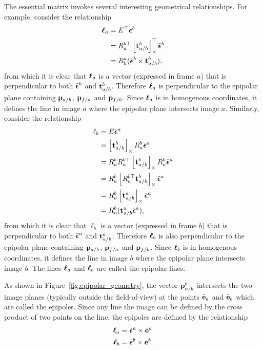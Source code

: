 The essential matrix invokes several interesting geometrical relationships.  For example, consider the relationship
\begin{align*}
\boldsymbol{\ell}_a &= E^\top \bar{\boldsymbol{\epsilon}}^b\\
	&= R_a^{b\top} \left\lfloor\mathbf{t}_{a/b}^b\right\rfloor_{\times}^\top \bar{\boldsymbol{\epsilon}}^b \\
	&= R_b^a (\bar{\boldsymbol{\epsilon}}^b \times \mathbf{t}_{a/b}^b),
\end{align*}
from which it is clear that $\boldsymbol{\ell}_a$ is a vector (expressed in frame $a$) that is perpendicular to both $\bar{\boldsymbol{\epsilon}}^b$ and $\mathbf{t}_{a/b}^b$.  Therefore $\boldsymbol{\ell}_a$ is perpendicular to the epipolar plane containing $\mathbf{p}_{a/b}$, $\mathbf{p}_{f/a}$ and $\mathbf{p}_{f/b}$.  Since $\boldsymbol{\ell}_a$ is in homogenous coordinates, it defines the line in image $a$ where the epipolar plane intersects image $a$.  
%
Similarly, consider the relationship
\begin{align*}
\ell_b &= E \bar{\boldsymbol{\epsilon}}^a \\
       &= \left\lfloor\mathbf{t}_{a/b}^b\right\rfloor_{\times}R_a^b \bar{\boldsymbol{\epsilon}}^a \\
       &= R_a^b R_a^{b\top} \left\lfloor\mathbf{t}_{a/b}^b\right\rfloor_{\times}R_a^b \bar{\boldsymbol{\epsilon}}^a \\
       &= R_a^b \left\lfloor R_a^{b\top}\mathbf{t}_{a/b}^b\right\rfloor_{\times} \bar{\boldsymbol{\epsilon}}^a\\
       &= R_a^b \left\lfloor\mathbf{t}_{a/b}^a\right\rfloor_{\times} \bar{\boldsymbol{\epsilon}}^a \\
       &= R_a^b (\mathbf{t}_{a/b}^a \bar{\boldsymbol{\epsilon}}^a),
\end{align*}
from which it is clear that $\ell_b$ is a vector (expressed in frame $b$) that is perpendicular to both $\bar{\boldsymbol{\epsilon}}^a$ and $\mathbf{t}_{a/b}^a$.  Therefore $\boldsymbol{\ell}_b$ is also perpendicular to the epipolar plane containing $\mathbf{p}_{a/b}$, $\mathbf{p}_{f/a}$ and $\mathbf{p}_{f/b}$.  Since $\boldsymbol{\ell}_b$ is in homogenous coordinates, it defines the line in image $b$ where the epipolar plane intersects image $b$.  
%
The lines $\boldsymbol{\ell}_a$ and $\boldsymbol{\ell}_b$ are called the epipolar lines.  

As shown in Figure~\ref{fig:epipolar_geometry}, the vector $\mathbf{p}_{a/b}^b$ intersects the two image planes (typically outside the field-of-view) at the points $\bar{\mathbf{e}}_a$ and $\bar{\mathbf{e}}_b$ which are called the epipoles.  Since any line the image can be defined by the cross product of two points on the line, the epipoles are defined by the relationship
\begin{align*}
\boldsymbol{\ell}_a &= \bar{\boldsymbol{\epsilon}}^a \times \bar{\mathbf{e}}^a \\
\boldsymbol{\ell}_b &= \bar{\boldsymbol{\epsilon}}^b \times \bar{\mathbf{e}}^b.
\end{align*}

